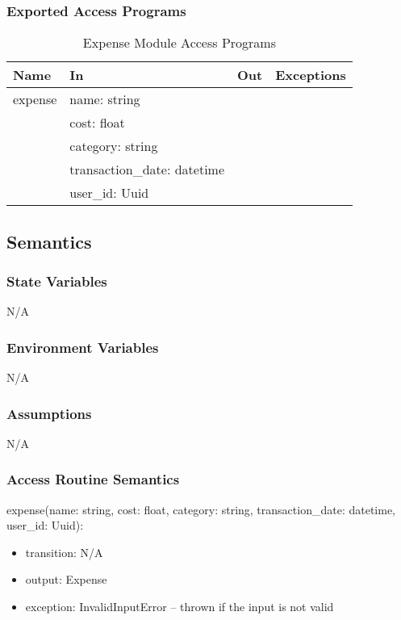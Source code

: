 \documentclass[12pt, titlepage]{article}
\begin{document}
\subsubsection{Exported Access Programs}

\begin{center}
  \begin{table}[H]
    \caption{Expense Module Access Programs}
\begin{tabular}{p{4cm} p{4cm} p{4cm} p{4cm}}
\hline
\textbf{Name} & \textbf{In} & \textbf{Out} & \textbf{Exceptions} \\
\hline
expense & name: string &  &  \\
  & cost: float &  &  \\
  & category: string &  &  \\
  & transaction\_date: datetime &  &  \\
  & user\_id: Uuid &  &  \\
\hline
\end{tabular}
\end{table}
\end{center}

\subsection{Semantics}

\subsubsection{State Variables}
N/A

\subsubsection{Environment Variables}
N/A

\subsubsection{Assumptions}
N/A

\subsubsection{Access Routine Semantics}

\noindent expense(name: string, cost: float, category: string,
transaction\_date: datetime, user\_id: Uuid):
\begin{itemize}
\item transition: N/A
\item output: Expense
\item exception: InvalidInputError -- thrown if the input is not valid
\end{itemize}
\end{document}
